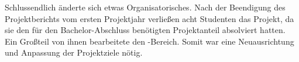 Schlussendlich änderte sich etwas Organisatorisches. Nach der
Beendigung des Projektberichts vom ersten Projektjahr verließen acht
Studenten das Projekt, da sie den für den Bachelor-Abschluss
benötigten Pro\-jekt\-an\-teil absolviert hatten. Ein Großteil von
ihnen bearbeitete den -Bereich. Somit war eine Neuausrichtung
und Anpassung der Projektziele nötig.
